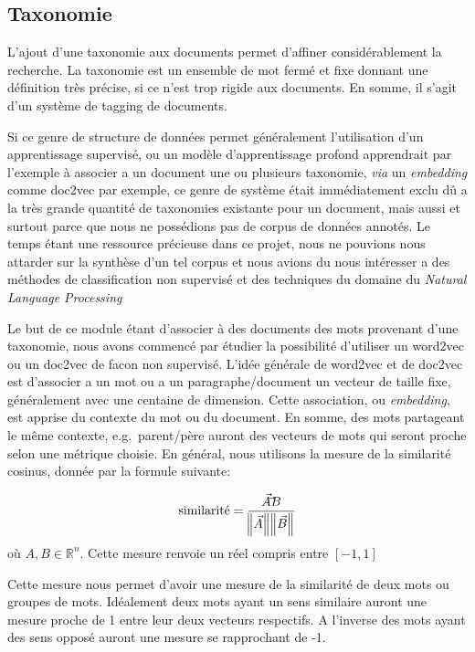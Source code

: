 \subsection{Taxonomie}%
L'ajout d'une taxonomie aux documents permet d'affiner considérablement la recherche. La taxonomie est un ensemble de mot fermé et fixe donnant une définition très précise, si ce n'est trop rigide aux documents. En somme, il s'agit d'un système de tagging de documents. 

Si ce genre de structure de données permet généralement l'utilisation d'un apprentissage supervisé, ou un modèle d'apprentissage profond apprendrait par l'exemple à associer a un document une ou plusieurs taxonomie, \textit{via} un \textit{embedding} comme doc2vec\cite{doc2vec} par exemple, ce genre de système était immédiatement exclu dû a la très grande quantité de taxonomies existante pour un document, mais aussi et surtout parce que nous ne possédions pas de corpus de données annotés. Le temps étant une ressource précieuse dans ce projet, nous ne pouvions nous attarder sur la synthèse d'un tel corpus et nous avions du nous intéresser a des méthodes de classification non supervisé et des techniques du domaine du \textit{Natural Language Processing}

Le but de ce module étant d'associer à des documents des mots provenant d'une taxonomie, nous avons commencé par étudier la possibilité d'utiliser un word2vec\cite{word2vec} ou un doc2vec de facon non supervisé. L'idée générale de word2vec et de doc2vec est d'associer a un mot ou a un paragraphe/document un vecteur de taille fixe, généralement avec une centaine de dimension. Cette association, ou \textit{embedding}, est apprise du contexte du mot ou du document. En somme, des mots partageant le même contexte, e.g.\ parent/père auront des vecteurs de mots qui seront proche selon une métrique choisie. En général, nous utilisons la mesure de la similarité cosinus, donnée par la formule suivante:

\begin{equation}
	\text{similarité} = \frac{\vec{A} \dot \vec{B}}{\norm{\vec{A}}\norm{\vec{B}}}
\end{equation}
où $A, B  \in \mathbb{R}^n$. Cette mesure renvoie un réel compris entre $[-1, 1]$

Cette mesure nous permet d'avoir une mesure de la similarité de deux mots ou groupes de mots. Idéalement deux mots ayant un sens similaire auront une mesure proche de 1 entre leur deux vecteurs respectifs. A l'inverse des mots ayant des sens opposé auront une mesure se rapprochant de -1. 

